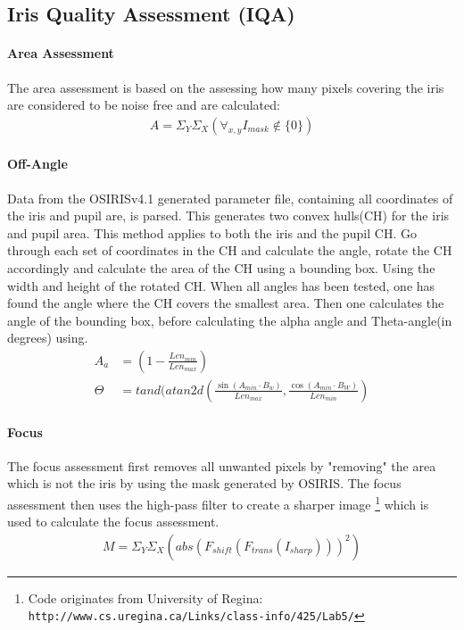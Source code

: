 \subsection{Iris Quality Assessment (IQA)}\label{sec:iqa}
\vspace{-3mm}
\paragraph{Area Assessment}
The area assessment is based on the assessing how many pixels covering the iris
are considered to be noise free and are calculated:
\begin{align}
A = \Sigma_Y\Sigma_X( \forall_{x,y} I_{mask}\notin\{0\} ) 
\end{align}


\paragraph{Off-Angle}
Data from the OSIRISv4.1 generated parameter file, containing all coordinates of
the iris and pupil are, is parsed. This generates two convex hulls(CH) for the 
iris and pupil area. This method applies to both the iris and the pupil CH. Go 
through each set of coordinates in the CH and calculate the angle, rotate the
CH accordingly and calculate the area of the CH using a bounding box. Using 
the width and height of the rotated CH. When all angles has been tested, one has
found the angle where the CH covers the smallest area.
Then one calculates the angle of the bounding box, before calculating the alpha 
angle and Theta-angle(in degrees) using. 
\vspace{-3mm}
\begin{align}
	A_a &= (1 - \frac{Len_{min}}{Len_{max}})\\
	\Theta &= tand( atan2d( \frac{\sin(A_{min} \cdot B_w)}{Len_{max}}, \frac{\cos(A_{min} \cdot B_W)}{Len_{min}} )
\end{align}


\paragraph{Focus}
The focus assessment first removes all unwanted pixels by "removing" the area
which is not the iris by using the mask generated by OSIRIS. The focus 
assessment then uses the high-pass filter to create a sharper image
\footnote{Code originates from University of Regina: \texttt{http://www.cs.uregina.ca/Links/class-info/425/Lab5/}} 
which is used to calculate the focus assessment.
\vspace{-3mm}
\begin{align}
M = \Sigma_Y\Sigma_X( abs( F_{shift}( F_{trans}( I_{sharp} ) ) )^2 ) 
\end{align}


